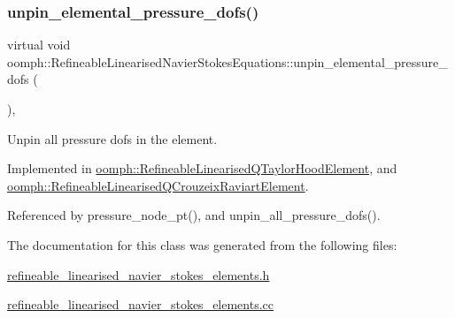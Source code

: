 \subsubsection{\texorpdfstring{unpin\+\_\+elemental\+\_\+pressure\+\_\+dofs()}{unpin\_elemental\_pressure\_dofs()}}
{\footnotesize\ttfamily virtual void oomph\+::\+Refineable\+Linearised\+Navier\+Stokes\+Equations\+::unpin\+\_\+elemental\+\_\+pressure\+\_\+dofs (\begin{DoxyParamCaption}{ }\end{DoxyParamCaption})\hspace{0.3cm}{\ttfamily [protected]}, {}}



Unpin all pressure dofs in the element. 



Implemented in \hyperlink{classoomph_1_1RefineableLinearisedQTaylorHoodElement_a42718cd6cb563e4a07b886ade967c8a2}{oomph\+::\+Refineable\+Linearised\+Q\+Taylor\+Hood\+Element}, and \hyperlink{classoomph_1_1RefineableLinearisedQCrouzeixRaviartElement_a9d591ec2c270582b5541d0d0767035a5}{oomph\+::\+Refineable\+Linearised\+Q\+Crouzeix\+Raviart\+Element}.



Referenced by pressure\+\_\+node\+\_\+pt(), and unpin\+\_\+all\+\_\+pressure\+\_\+dofs().



The documentation for this class was generated from the following files\+:\begin{DoxyCompactItemize}
\item 
\hyperlink{refineable__linearised__navier__stokes__elements_8h}{refineable\+\_\+linearised\+\_\+navier\+\_\+stokes\+\_\+elements.\+h}\item 
\hyperlink{refineable__linearised__navier__stokes__elements_8cc}{refineable\+\_\+linearised\+\_\+navier\+\_\+stokes\+\_\+elements.\+cc}\end{DoxyCompactItemize}

